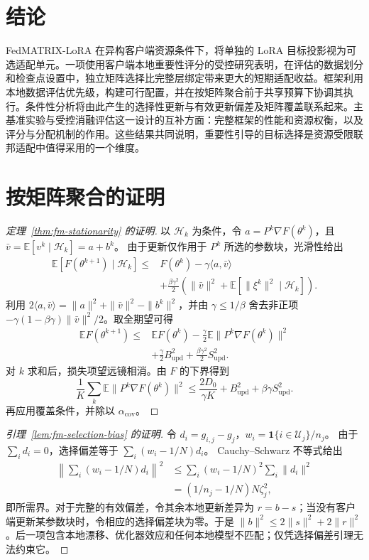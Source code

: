 \documentclass[10pt,conference,letterpaper]{IEEEtran}
\begin{document}
\FloatBarrier
\section{结论}\label{Sec.conclusion}
FedMATRIX-LoRA 在异构客户端资源条件下，将单独的 LoRA 目标投影视为可选适配单元。一项使用客户端本地重要性评分的受控研究表明，在评估的数据划分和检查点设置中，独立矩阵选择比完整层绑定带来更大的短期适配收益。框架利用本地数据评估优先级，构建可行配置，并在按矩阵聚合前于共享预算下协调其执行。条件性分析将由此产生的选择性更新与有效更新偏差及矩阵覆盖联系起来。主基准实验与受控消融评估这一设计的互补方面：完整框架的性能和资源权衡，以及评分与分配机制的作用。这些结果共同说明，重要性引导的目标选择是资源受限联邦适配中值得采用的一个维度。

\appendices
\section{按矩阵聚合的证明}
\label{app:fm-convergence}
\begin{proof}[定理~\ref{thm:fm-stationarity} 的证明]
以 $\mathcal H_k$ 为条件，令 $a=P^k\nabla F(\theta^k)$，且
$\bar v=\mathbb E[v^k\mid\mathcal H_k]=a+b^k$。
由于更新仅作用于 $P^k$ 所选的参数块，光滑性给出
\begin{align}
 \mathbb E[F(\theta^{k+1})\mid\mathcal H_k]
 \le{}&F(\theta^k)-\gamma\langle a,\bar v\rangle\\
 &+\frac{\beta\gamma^2}{2}
 \left(\|\bar v\|^2+\mathbb E[\|\xi^k\|^2\mid\mathcal H_k]\right).\nonumber
\end{align}
利用 $2\langle a,\bar v\rangle=\|a\|^2+\|\bar v\|^2-\|b^k\|^2$，并由
$\gamma\le1/\beta$ 舍去非正项
$-\gamma(1-\beta\gamma)\|\bar v\|^2/2$。取全期望可得
\begin{align}
 \mathbb E F(\theta^{k+1})\le{}&\mathbb E F(\theta^k)
 -\frac\gamma2\mathbb E\|P^k\nabla F(\theta^k)\|^2\\
 &+\frac\gamma2B_{\mathrm{upd}}^2
 +\frac{\beta\gamma^2}{2}S_{\mathrm{upd}}^2.\nonumber
\end{align}
对 $k$ 求和后，损失项望远镜相消。由 $F$ 的下界得到
\begin{equation}
 \frac1K\sum_k\mathbb E\|P^k\nabla F(\theta^k)\|^2
 \le\frac{2D_0}{\gamma K}+B_{\mathrm{upd}}^2+\beta\gamma S_{\mathrm{upd}}^2.
\end{equation}
再应用覆盖条件，并除以 $\alpha_{\mathrm{cov}}$。
\end{proof}

\begin{proof}[引理~\ref{lem:fm-selection-bias} 的证明]
令 $d_i=g_{i,j}-g_j$，$w_i=\mathbf1\{i\in\mathcal U_j\}/n_j$。
由于 $\sum_i d_i=0$，选择偏差等于 $\sum_i(w_i-1/N)d_i$。
Cauchy--Schwarz 不等式给出
\begin{align}
 \left\|\sum_i(w_i-1/N)d_i\right\|^2
 &\le\sum_i(w_i-1/N)^2\sum_i\|d_i\|^2\\
 &=(1/n_j-1/N)N\zeta_j^2,
\end{align}
即所需界。对于完整的有效偏差，令其余本地更新差异为 $r=b-s$；当没有客户端更新某参数块时，令相应的选择偏差块为零。于是 $\|b\|^2\le2\|s\|^2+2\|r\|^2$。后一项包含本地漂移、优化器效应和任何本地模型不匹配；仅凭选择偏差引理无法约束它。
\end{proof}
\end{document}
